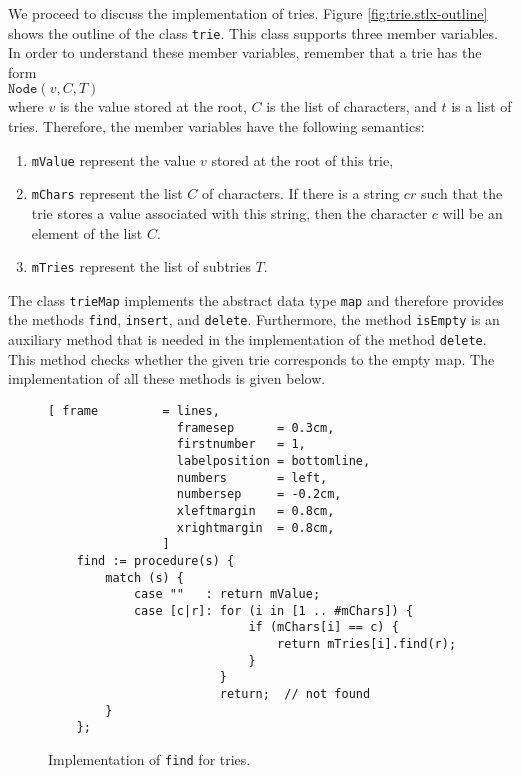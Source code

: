 \noindent
We proceed to discuss the implementation of tries.  Figure \ref{fig:trie.stlx-outline} shows the
outline of the class \texttt{trie}.  This class supports three member variables.  In order to
understand these member variables, remember that a trie has the form
\\[0.2cm]
\hspace*{1.3cm}
$\texttt{Node}(v, C, T)$
\\[0.2cm]
where $v$ is the value stored at the root, $C$ is the list of characters, and $t$ is a list of
tries.  Therefore, the member variables have the following semantics:
\begin{enumerate}
\item \texttt{mValue} represent the value $v$ stored at the root of this trie,  
\item \texttt{mChars} represent the list  $C$ of characters.  If there is a string $cr$ such that
      the trie stores a value associated with this string, then the character $c$ will be an element of
      the list $C$.
\item \texttt{mTries} represent the list of subtries $T$.  
\end{enumerate}
The class \texttt{trieMap} implements the abstract data type \texttt{map} and therefore provides the
methods \texttt{find}, \texttt{insert}, and \texttt{delete}.  Furthermore, the method
\texttt{isEmpty} is an auxiliary method that is needed in the implementation of the method 
\texttt{delete}.  This method checks whether the given trie corresponds to the empty map.  The
implementation of all these methods is given below. 

\begin{figure}[!ht]
\centering
\begin{Verbatim}[ frame         = lines, 
                  framesep      = 0.3cm, 
                  firstnumber   = 1,
                  labelposition = bottomline,
                  numbers       = left,
                  numbersep     = -0.2cm,
                  xleftmargin   = 0.8cm,
                  xrightmargin  = 0.8cm,
                ]
    find := procedure(s) {
        match (s) {
            case ""   : return mValue;
            case [c|r]: for (i in [1 .. #mChars]) {
                            if (mChars[i] == c) {
                                return mTries[i].find(r);
                            }
                        }
                        return;  // not found
        }
    };
\end{Verbatim}
\vspace*{-0.3cm}
\caption{Implementation of \texttt{find} for tries.}
\label{fig:trie.stlx-find}
\end{figure}


